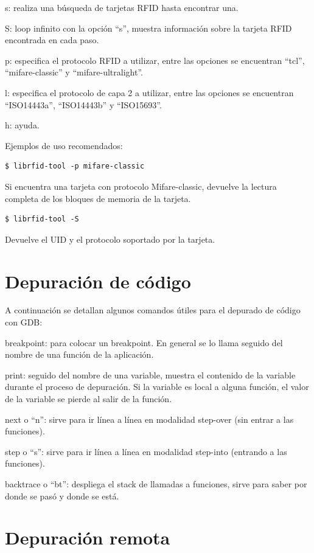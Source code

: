 s: realiza una búsqueda de tarjetas RFID hasta encontrar una.

S: loop infinito con la opción “s”, muestra información sobre la tarjeta RFID encontrada en cada paso.

p: especifica el protocolo RFID a utilizar, entre las opciones se encuentran “tcl”, “mifare-classic” y  “mifare-ultralight”.

l: especifica el protocolo de capa 2 a utilizar, entre las opciones se encuentran “ISO14443a”, “ISO14443b” y “ISO15693”.

h: ayuda.

\bigskip
Ejemplos de uso recomendados:

\begin{verbatim}
$ librfid-tool -p mifare-classic
\end{verbatim}

Si encuentra una tarjeta con protocolo Mifare-classic, devuelve la lectura completa de los bloques de memoria de la tarjeta.

\begin{verbatim}
$ librfid-tool -S
\end{verbatim}

Devuelve el UID y el protocolo soportado por la tarjeta.


\section{Depuración de código}\label{depurar}

A continuación se detallan algunos comandos útiles para el depurado de código con GDB:

breakpoint: para colocar un breakpoint. En general se lo llama seguido del nombre de una función de la aplicación.

print: seguido del nombre de una variable, muestra el contenido de la variable durante el proceso de depuración. Si la variable es local a alguna función, el valor de la variable se pierde al salir de la función.

next o “n”: sirve para ir línea a línea en modalidad step-over (sin entrar a las funciones).

step o “s”: sirve para ir línea a línea en modalidad step-into (entrando a las funciones).

backtrace o “bt”: despliega el stack de llamadas a funciones, sirve para saber por donde se pasó y donde se está.


\section{Depuración remota}\label{GDB}

